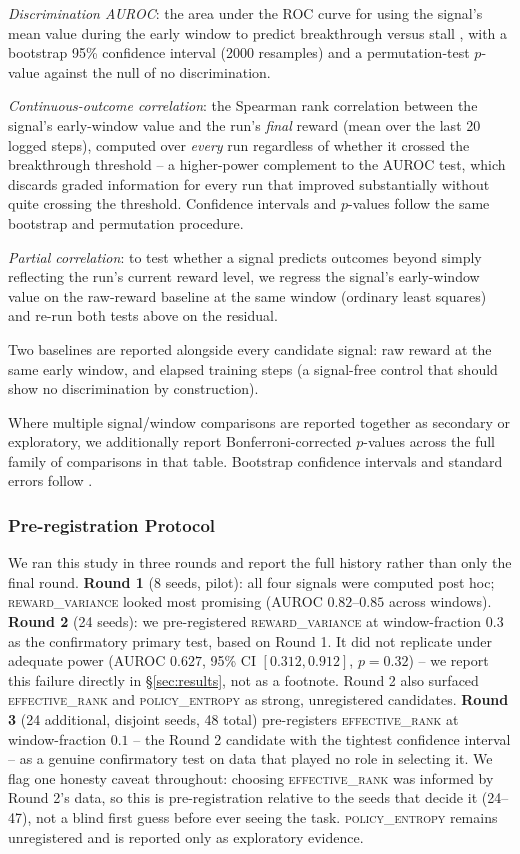 \documentclass{article}
\newcommand{\erank}{\textsc{effective\_rank}}
\newcommand{\pentropy}{\textsc{policy\_entropy}}
\newcommand{\rvar}{\textsc{reward\_variance}}
\begin{document}
\emph{Discrimination AUROC}: the area under the ROC curve for using the
signal's mean value during the early window to predict breakthrough versus
stall \citep{hanley1982meaning}, with a bootstrap 95\% confidence interval
(2000 resamples) and a permutation-test $p$-value against the null of no
discrimination.

\emph{Continuous-outcome correlation}: the Spearman rank correlation
\citep{spearman1904proof} between the signal's early-window value and the
run's \emph{final} reward (mean over the last 20 logged steps), computed over
\emph{every} run regardless of whether it crossed the breakthrough threshold --
a higher-power complement to the AUROC test, which discards graded information
for every run that improved substantially without quite crossing the
threshold. Confidence intervals and $p$-values follow the same bootstrap and
permutation procedure.

\emph{Partial correlation}: to test whether a signal predicts outcomes beyond
simply reflecting the run's current reward level, we regress the signal's
early-window value on the raw-reward baseline at the same window (ordinary
least squares) and re-run both tests above on the residual.

Two baselines are reported alongside every candidate signal: raw reward at the
same early window, and elapsed training steps (a signal-free control that
should show no discrimination by construction).

Where multiple signal/window comparisons are reported together as secondary or
exploratory, we additionally report Bonferroni-corrected $p$-values
\citep{bonferroni1936teoria} across the full family of comparisons in that
table. Bootstrap confidence intervals and standard errors follow
\citet{efron1979bootstrap,efron1994introduction}.

\subsubsection{Pre-registration Protocol}
\label{sec:preregistration}

We ran this study in three rounds and report the full history rather than only
the final round. \textbf{Round 1} (8 seeds, pilot): all four signals were
computed post hoc; \rvar{} looked most promising (AUROC $0.82$--$0.85$ across
windows). \textbf{Round 2} (24 seeds): we pre-registered \rvar{} at
window-fraction $0.3$ as the confirmatory primary test, based on Round 1. It
did not replicate under adequate power (AUROC $0.627$, 95\% CI
$[0.312, 0.912]$, $p{=}0.32$) -- we report this failure directly in
\S\ref{sec:results}, not as a footnote. Round 2 also surfaced \erank{} and
\pentropy{} as strong, unregistered candidates. \textbf{Round 3} (24
additional, disjoint seeds, 48 total) pre-registers \erank{} at window-fraction
$0.1$ -- the Round 2 candidate with the tightest confidence interval -- as a
genuine confirmatory test on data that played no role in selecting it. We flag
one honesty caveat throughout: choosing \erank{} was informed by Round 2's
data, so this is pre-registration relative to the seeds that decide it (24--47),
not a blind first guess before ever seeing the task. \pentropy{} remains
unregistered and is reported only as exploratory evidence.
\end{document}
